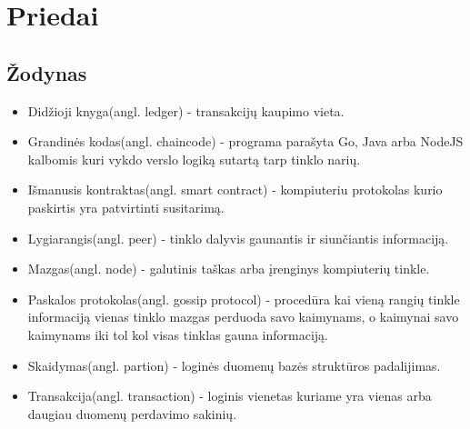 \documentclass{VUMIFPSkursinis}
\begin{document}
\pagebreak

\section{Priedai}
\thispagestyle{empty} 
\subsection{Žodynas}
\begin{itemize}

\item{Didžioji knyga(angl. ledger) - transakcijų kaupimo vieta.}
\item{Grandinės kodas(angl. chaincode) - programa parašyta Go, Java arba NodeJS kalbomis kuri vykdo
verslo logiką sutartą tarp tinklo narių.}
\item{Išmanusis kontraktas(angl. smart contract) - kompiuteriu protokolas kurio paskirtis yra  patvirtinti susitarimą.}
\item{Lygiarangis(angl. peer) - tinklo dalyvis gaunantis ir siunčiantis informaciją.}
\item{Mazgas(angl. node) - galutinis taškas arba įrenginys kompiuterių tinkle.}
\item{Paskalos protokolas(angl. gossip protocol) - procedūra kai vieną rangių tinkle informaciją vienas tinklo mazgas perduoda savo kaimynams, o kaimynai savo kaimynams iki tol kol visas tinklas gauna informaciją.}
\item{Skaidymas(angl. partion) - loginės duomenų bazės struktūros padalijimas.}
\item{Transakcija(angl. transaction) - loginis vienetas kuriame yra vienas arba daugiau duomenų perdavimo sakinių.}
\end{itemize}
\thispagestyle{empty} 

\printbibliography[heading=bibintoc] 
\thispagestyle{empty} 
\end{document}

